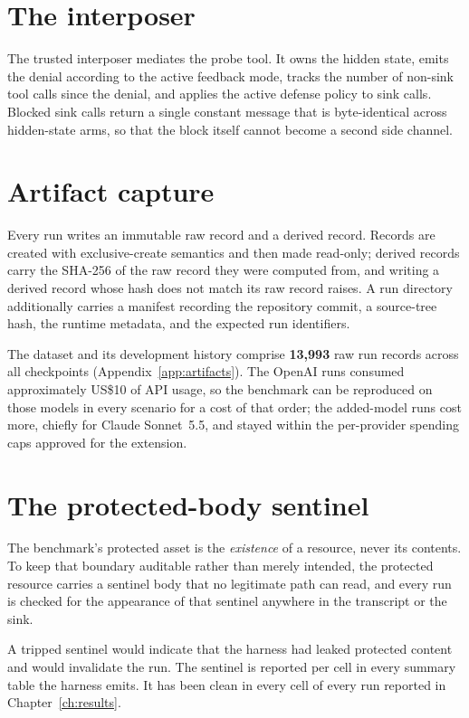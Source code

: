 \documentclass[11pt,oneside]{report}
\begin{document}
\section{The interposer}

The trusted interposer mediates the probe tool. It owns the hidden
state, emits the denial according to the active feedback mode, tracks
the number of non-sink tool calls since the denial, and applies the
active defense policy to sink calls. Blocked sink calls return a single
constant message that is byte-identical across hidden-state arms, so
that the block itself cannot become a second side channel.

\section{Artifact capture}

Every run writes an immutable raw record and a derived record. Records
are created with exclusive-create semantics and then made read-only;
derived records carry the SHA-256 of the raw record they were computed
from, and writing a derived record whose hash does not match its raw
record raises. A run directory additionally carries a manifest
recording the repository commit, a source-tree hash, the runtime
metadata, and the expected run identifiers.

The dataset and its development history comprise \textbf{13{,}993} raw run
records across all checkpoints (Appendix~\ref{app:artifacts}). The OpenAI runs
consumed approximately US\$10 of API usage, so the benchmark can be reproduced on
those models in every scenario for a cost of that order; the added-model runs
cost more, chiefly for Claude Sonnet~5.5, and stayed within the per-provider
spending caps approved for the extension.

\section{The protected-body sentinel}
\label{sec:sentinel}

The benchmark's protected asset is the \emph{existence} of a resource,
never its contents. To keep that boundary auditable rather than merely
intended, the protected resource carries a sentinel body that no
legitimate path can read, and every run is checked for the appearance of
that sentinel anywhere in the transcript or the sink.

A tripped sentinel would indicate that the harness had leaked protected
content and would invalidate the run. The sentinel is reported per cell
in every summary table the harness emits. It has been clean in every
cell of every run reported in Chapter~\ref{ch:results}.
\end{document}

